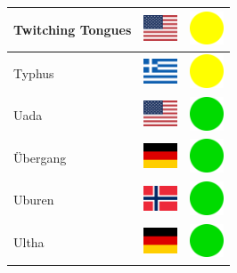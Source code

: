 \documentclass[12pt, a4paper, twoside]{report}
\begin{document}
\begin{center}
\begin{longtable}{|p{5cm}|p{2cm}|p{2cm}|}
 Twitching Tongues                                          & \includegraphics[width=1cm]{../4x3/us} &   \includegraphics[width=1cm]{../likes/m} \\ \hline
 Typhus                                                     & \includegraphics[width=1cm]{../4x3/gr} &   \includegraphics[width=1cm]{../likes/m} \\ \hline
 Uada                                                       & \includegraphics[width=1cm]{../4x3/us} &   \includegraphics[width=1cm]{../likes/y} \\ \hline
 Übergang                                                   & \includegraphics[width=1cm]{../4x3/de} &   \includegraphics[width=1cm]{../likes/y} \\ \hline
 Uburen                                                     & \includegraphics[width=1cm]{../4x3/no} &   \includegraphics[width=1cm]{../likes/y} \\ \hline
 Ultha                                                      & \includegraphics[width=1cm]{../4x3/de} &   \includegraphics[width=1cm]{../likes/y} \\ \hline

\end{longtable}
\end{center}
\end{document}
